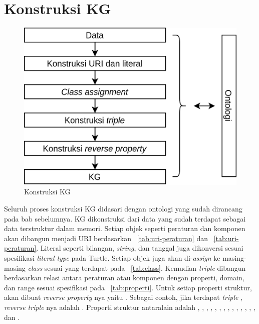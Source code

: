 \section{Konstruksi KG}
\label{data-to-triple}

\begin{figure}
  \centering
  \includegraphics[scale=0.4]{pictures/konstruksi_kg.png}
  \caption{Konstruksi KG}
  \label{fig:konstruksi-kg}
\end{figure}

Seluruh proses konstruksi KG didasari dengan ontologi yang sudah dirancang pada bab sebelumnya. KG
dikonstruksi dari data \legal yang sudah terdapat sebagai data terstruktur dalam memori. Setiap
objek seperti peraturan dan komponen akan dibangun menjadi URI berdasarkan
\tab~\ref{tab:uri-peraturan} dan \tab~\ref{tab:uri-peraturan}. Literal seperti bilangan,
\textit{string}, dan tanggal juga dikonversi sesuai spesifikasi \textit{literal type} pada Turtle.
Setiap objek juga akan di-\textit{assign} ke masing-masing \textit{class} sesuai yang terdapat pada
\tab~\ref{tab:class}. Kemudian \textit{triple} dibangun berdasarkan relasi antara peraturan atau
komponen dengan properti, domain, dan range sesuai spesifikasi pada \tab~\ref{tab:properti}. Untuk
setiap properti struktur, akan dibuat \textit{reverse property} nya yaitu .
Sebagai contoh, jika terdapat \textit{triple} ,
\textit{reverse triple} nya adalah . Properti struktur
antaralain adalah , , , ,
, , , ,
, , , , ,
, dan .


